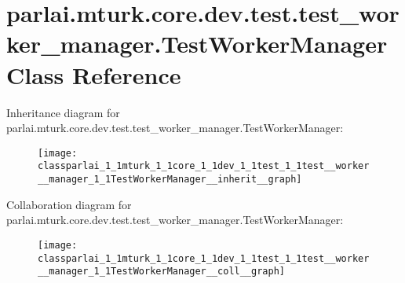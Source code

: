 \hypertarget{classparlai_1_1mturk_1_1core_1_1dev_1_1test_1_1test__worker__manager_1_1TestWorkerManager}{}\section{parlai.\+mturk.\+core.\+dev.\+test.\+test\+\_\+worker\+\_\+manager.\+Test\+Worker\+Manager Class Reference}
\label{classparlai_1_1mturk_1_1core_1_1dev_1_1test_1_1test__worker__manager_1_1TestWorkerManager}


Inheritance diagram for parlai.\+mturk.\+core.\+dev.\+test.\+test\+\_\+worker\+\_\+manager.\+Test\+Worker\+Manager\+:
\nopagebreak
\begin{figure}[H]
\begin{center}
\leavevmode
\texttt{[image: classparlai\_1\_1mturk\_1\_1core\_1\_1dev\_1\_1test\_1\_1test\_\_worker\_\_manager\_1\_1TestWorkerManager\_\_inherit\_\_graph]}
\end{center}
\end{figure}


Collaboration diagram for parlai.\+mturk.\+core.\+dev.\+test.\+test\+\_\+worker\+\_\+manager.\+Test\+Worker\+Manager\+:
\nopagebreak
\begin{figure}[H]
\begin{center}
\leavevmode
\texttt{[image: classparlai\_1\_1mturk\_1\_1core\_1\_1dev\_1\_1test\_1\_1test\_\_worker\_\_manager\_1\_1TestWorkerManager\_\_coll\_\_graph]}
\end{center}
\end{figure}
